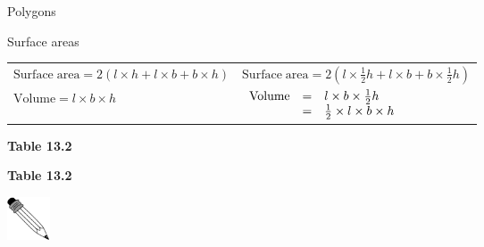 \begin{exercises}{Polygons}
\begin{exercises}{Surface areas }
\begin{table}[H]
\begin{center}
\begin{xtabular}[t]{|l|l|}
    
        $\mathrm{Surface\; area}=2\left(l\ensuremath{\times}h+l\ensuremath{\times}b+b\ensuremath{\times}h\right)$ &
    
    
        $\mathrm{Surface\; area}=2\left(l\ensuremath{\times}\frac{1}{2}h+l\ensuremath{\times}b+b\ensuremath{\times}\frac{1}{2}h\right)$%
     \tabularnewline{}
    
    
        $\mathrm{Volume}=l\ensuremath{\times}b\ensuremath{\times}h$ &
    
    
        $\begin{array}{ccc}\hfill \mathrm{Volume}& =& l\ensuremath{\times}b\ensuremath{\times}\frac{1}{2}h\hfill \\ & =& \frac{1}{2}\ensuremath{\times}l\ensuremath{\times}b\ensuremath{\times}h\hfill \end{array}$%
     \tabularnewline{}
    \end{xtabular}
      \end{center}
    \begin{center}{\small\bfseries Table 13.2}\end{center}
    \begin{caption}{\small\bfseries Table 13.2}\end{caption}
\end{table}
      
    \par
  
\par
            \label{m39357*secfhsst!!!underscore!!!id147}\vspace{.5cm} 
      
      \noindent
      \hspace*{-30pt}\includegraphics[width=0.5in]{col11306.imgs/pspencil2.png}   
\end{exercises}
\end{exercises}
